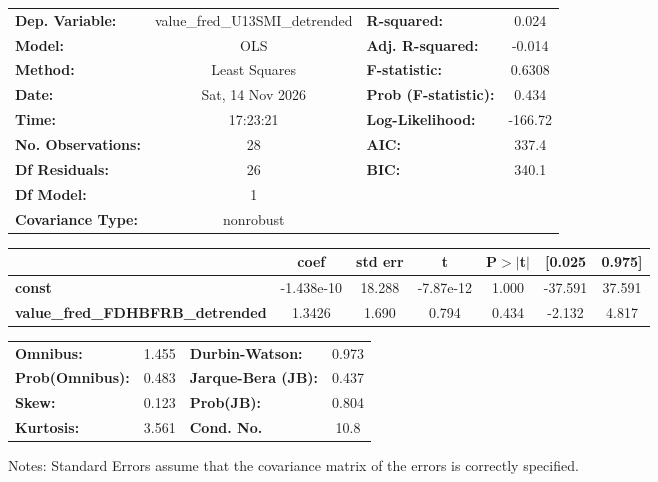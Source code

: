 \begin{center}
\begin{tabular}{lclc}
\toprule
\textbf{Dep. Variable:}                  & value\_fred\_U13SMI\_detrended & \textbf{  R-squared:         } &     0.024   \\
\textbf{Model:}                          &              OLS               & \textbf{  Adj. R-squared:    } &    -0.014   \\
\textbf{Method:}                         &         Least Squares          & \textbf{  F-statistic:       } &    0.6308   \\
\textbf{Date:}                           &        Sat, 14 Nov 2026        & \textbf{  Prob (F-statistic):} &    0.434    \\
\textbf{Time:}                           &            17:23:21            & \textbf{  Log-Likelihood:    } &   -166.72   \\
\textbf{No. Observations:}               &                 28             & \textbf{  AIC:               } &     337.4   \\
\textbf{Df Residuals:}                   &                 26             & \textbf{  BIC:               } &     340.1   \\
\textbf{Df Model:}                       &                  1             & \textbf{                     } &             \\
\textbf{Covariance Type:}                &           nonrobust            & \textbf{                     } &             \\
\bottomrule
\end{tabular}
\begin{tabular}{lcccccc}
                                         & \textbf{coef} & \textbf{std err} & \textbf{t} & \textbf{P$> |$t$|$} & \textbf{[0.025} & \textbf{0.975]}  \\
\midrule
\textbf{const}                           &   -1.438e-10  &       18.288     & -7.87e-12  &         1.000        &      -37.591    &       37.591     \\
\textbf{value\_fred\_FDHBFRB\_detrended} &       1.3426  &        1.690     &     0.794  &         0.434        &       -2.132    &        4.817     \\
\bottomrule
\end{tabular}
\begin{tabular}{lclc}
\textbf{Omnibus:}       &  1.455 & \textbf{  Durbin-Watson:     } &    0.973  \\
\textbf{Prob(Omnibus):} &  0.483 & \textbf{  Jarque-Bera (JB):  } &    0.437  \\
\textbf{Skew:}          &  0.123 & \textbf{  Prob(JB):          } &    0.804  \\
\textbf{Kurtosis:}      &  3.561 & \textbf{  Cond. No.          } &     10.8  \\
\bottomrule
\end{tabular}
\end{center}

Notes: \newline
 [1] Standard Errors assume that the covariance matrix of the errors is correctly specified.